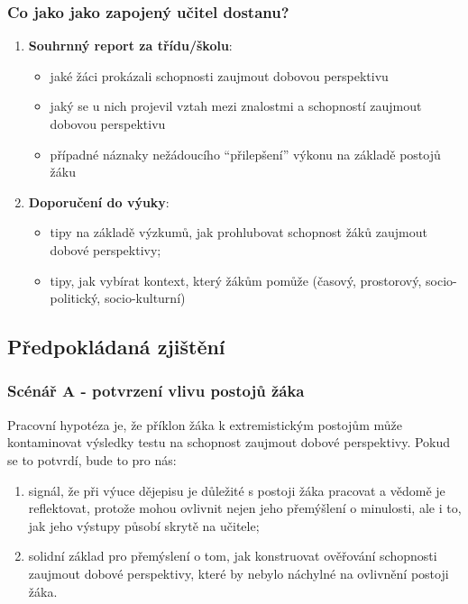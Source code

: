 \documentclass[
  12pt,
  english,
  a4paper,
  extrafontsizes,onecolumn,openright
  ]{memoir}
\providecommand{\tightlist}{%
  \setlength{\itemsep}{0pt}\setlength{\parskip}{0pt}}
\begin{document}
\subsubsection{Co jako jako zapojený učitel dostanu?}\label{co-jako-jako-zapojenuxfd-uux10ditel-dostanu}

\begin{enumerate}
\def\labelenumi{\arabic{enumi}.}
\tightlist
\item
  \textbf{Souhrnný report za třídu/školu}:

  \begin{itemize}
  \tightlist
  \item
    jaké žáci prokázali schopnosti zaujmout dobovou perspektivu
  \item
    jaký se u nich projevil vztah mezi znalostmi a schopností zaujmout dobovou perspektivu
  \item
    případné náznaky nežádoucího \enquote{přilepšení} výkonu na základě postojů žáku
  \end{itemize}
\item
  \textbf{Doporučení do výuky}:

  \begin{itemize}
  \tightlist
  \item
    tipy na základě výzkumů, jak prohlubovat schopnost žáků zaujmout dobové perspektivy;
  \item
    tipy, jak vybírat kontext, který žákům pomůže (časový, prostorový, socio-politický, socio-kulturní)
  \end{itemize}
\end{enumerate}

\subsection{Předpokládaná zjištění}\label{pux159edpokluxe1danuxe1-zjiux161tux11bnuxed}

\subsubsection{Scénář A - potvrzení vlivu postojů žáka}\label{scuxe9nuxe1ux159-a---potvrzenuxed-vlivu-postojux16f-ux17euxe1ka}

Pracovní hypotéza je, že příklon žáka k extremistickým postojům může kontaminovat výsledky testu na schopnost zaujmout dobové perspektivy. Pokud se to potvrdí, bude to pro nás:

\begin{enumerate}
\def\labelenumi{\arabic{enumi}.}
\tightlist
\item
  signál, že při výuce dějepisu je důležité s postoji žáka pracovat a vědomě je reflektovat, protože mohou ovlivnit nejen jeho přemýšlení o minulosti, ale i to, jak jeho výstupy působí skrytě na učitele;
\item
  solidní základ pro přemýslení o tom, jak konstruovat ověřování schopnosti zaujmout dobové perspektivy, které by nebylo náchylné na ovlivnění postoji žáka.
\end{enumerate}
\end{document}
